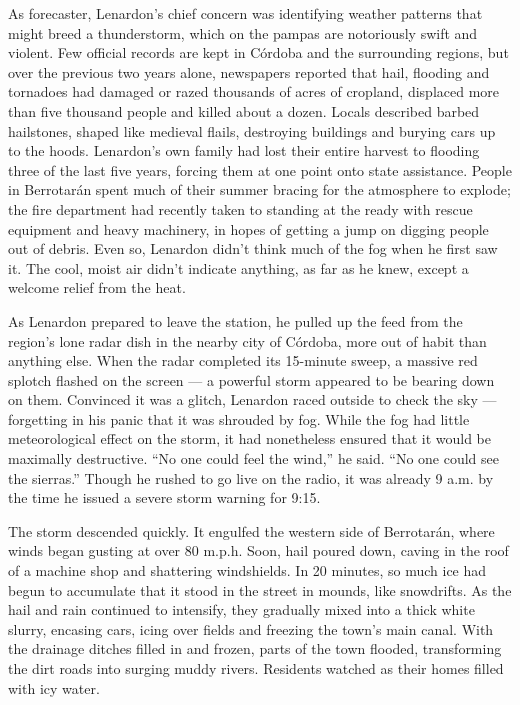 As forecaster, Lenardon's chief concern was identifying weather patterns
that might breed a thunderstorm, which on the pampas are notoriously
swift and violent. Few official records are kept in Córdoba and the
surrounding regions, but over the previous two years alone, newspapers
reported that hail, flooding and tornadoes had damaged or razed
thousands of acres of cropland, displaced more than five thousand people
and killed about a dozen. Locals described barbed hailstones, shaped
like medieval flails, destroying buildings and burying cars up to the
hoods. Lenardon's own family had lost their entire harvest to flooding
three of the last five years, forcing them at one point onto state
assistance. People in Berrotarán spent much of their summer bracing for
the atmosphere to explode; the fire department had recently taken to
standing at the ready with rescue equipment and heavy machinery, in
hopes of getting a jump on digging people out of debris. Even so,
Lenardon didn't think much of the fog when he first saw it. The cool,
moist air didn't indicate anything, as far as he knew, except a welcome
relief from the heat.

As Lenardon prepared to leave the station, he pulled up the feed from
the region's lone radar dish in the nearby city of Córdoba, more out of
habit than anything else. When the radar completed its 15-minute sweep,
a massive red splotch flashed on the screen --- a powerful storm
appeared to be bearing down on them. Convinced it was a glitch, Lenardon
raced outside to check the sky --- forgetting in his panic that it was
shrouded by fog. While the fog had little meteorological effect on the
storm, it had nonetheless ensured that it would be maximally
destructive. ``No one could feel the wind,'' he said. ``No one could see
the sierras.'' Though he rushed to go live on the radio, it was already
9 a.m. by the time he issued a severe storm warning for 9:15.

The storm descended quickly. It engulfed the western side of Berrotarán,
where winds began gusting at over 80 m.p.h. Soon, hail poured down,
caving in the roof of a machine shop and shattering windshields. In 20
minutes, so much ice had begun to accumulate that it stood in the street
in mounds, like snowdrifts. As the hail and rain continued to intensify,
they gradually mixed into a thick white slurry, encasing cars, icing
over fields and freezing the town's main canal. With the drainage
ditches filled in and frozen, parts of the town flooded, transforming
the dirt roads into surging muddy rivers. Residents watched as their
homes filled with icy water.


